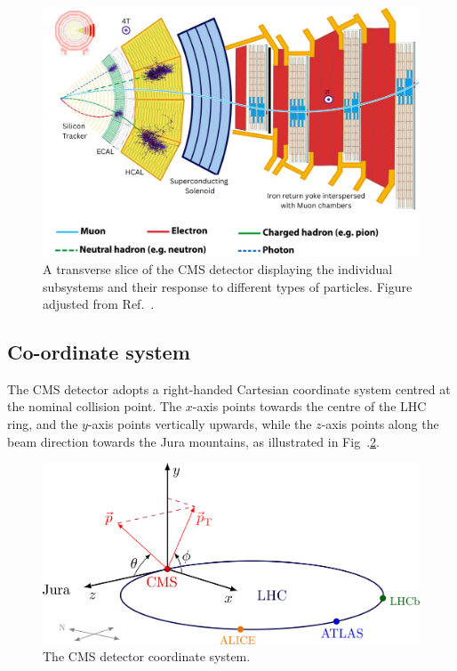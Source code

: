 \begin{figure}[h]
\centering
\includegraphics[width= 1\textwidth]{Figures/Chapter3/CMS_Detector_Slice.pdf}
\caption{A transverse slice of the CMS detector displaying the individual subsystems and their response to different types of particles. Figure adjusted from Ref.~\cite{CMS_Detector_Slice}.}
\label{Figure:Chapter3_CMS_slice}
\end{figure}

\subsection{Co-ordinate system}
The CMS detector adopts a right-handed Cartesian coordinate system centred at the nominal collision point. The $x$-axis points towards the centre of the LHC ring, and the $y$-axis points vertically upwards, while the $z$-axis points along the beam direction towards the Jura mountains, as illustrated in Fig~.\ref{Figure:Chapter3_CMS_CoordinateSystem}.

\begin{figure}[h]
\centering
\includegraphics[width= 1\textwidth]{Figures/Chapter3/CMS_CoordinateSystem.png}
\caption{The CMS detector coordinate system.}
\label{Figure:Chapter3_CMS_CoordinateSystem}
\end{figure}

